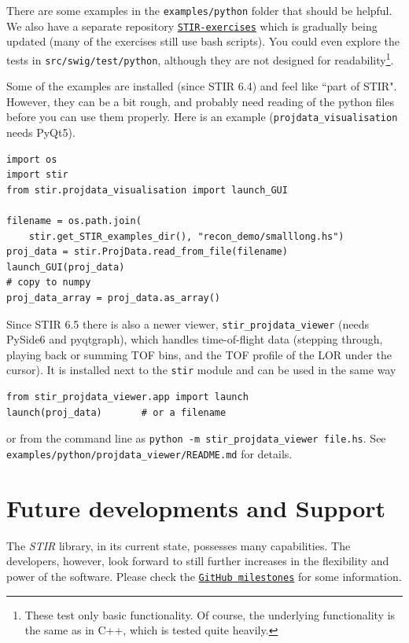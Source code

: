 \documentclass{article}
\def\url#1#2{\mbox{\href{#1}{\tt #2}}}
\begin{document}
{{{{{{  There are some examples in the \texttt{examples/python} folder that should be helpful.
  We also have a separate repository \url{https://github.com/UCL/STIR-exercises}{STIR-exercises}
  which is gradually being updated (many of the exercises still use bash scripts).
  You could even explore the tests in \texttt{src/swig/test/python}, although they are not
  designed for readability\footnote{These test only basic functionality.  Of course, the underlying
  functionality is the same as in C++, which is tested quite heavily.}.

  Some of the examples are installed (since STIR 6.4) and feel like ``part of STIR". However,
  they can be a bit rough, and probably need reading of the python files before you can use them properly.
  Here is an example (\texttt{projdata\_visualisation} needs PyQt5).
  \begin{verbatim}
import os
import stir
from stir.projdata_visualisation import launch_GUI

filename = os.path.join(
    stir.get_STIR_examples_dir(), "recon_demo/smalllong.hs")
proj_data = stir.ProjData.read_from_file(filename)    
launch_GUI(proj_data)
# copy to numpy
proj_data_array = proj_data.as_array()
  \end{verbatim}

  Since STIR 6.5 there is also a newer viewer, \texttt{stir\_projdata\_viewer} (needs PySide6 and pyqtgraph),
  which handles time-of-flight data (stepping through, playing back or summing TOF bins, and the TOF profile of the
  LOR under the cursor). It is installed next to the \texttt{stir} module and can be used in the same way
  \begin{verbatim}
from stir_projdata_viewer.app import launch
launch(proj_data)       # or a filename
  \end{verbatim}
  or from the command line as \texttt{python -m stir\_projdata\_viewer file.hs}. See
  \texttt{examples/python/projdata\_viewer/README.md} for details.

\section{
Future developments and Support}

The \textit{STIR} library, in its current state, possesses many capabilities. 
The developers, however, look forward to still further increases 
in the flexibility and power of the software.
Please check the \url{https://github.com/UCL/STIR/milestones}{GitHub milestones}
for some information.


}}}}}}
\end{document}

